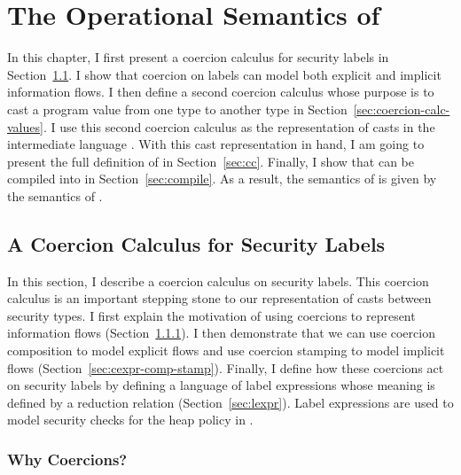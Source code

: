 \chapter{The Operational Semantics of \Surface}
\label{ch:sem}

In this chapter, I first present a coercion calculus for security labels in
Section~\ref{sec:coercion-calc-labels}. I show that coercion on labels can model
both explicit and implicit information flows. I then define a second coercion
calculus whose purpose is to cast a program value from one type to another type
in Section~\ref{sec:coercion-calc-values}. I use this second coercion calculus
as the representation of casts in the intermediate language \CC. With this cast
representation in hand, I am going to present the full definition of \CC in
Section~\ref{sec:cc}. Finally, I show that \Surface can be compiled into \CC in
Section~\ref{sec:compile}. As a result, the semantics of \Surface is given by
the semantics of \CC.

\section{A Coercion Calculus for Security Labels}
\label{sec:coercion-calc-labels}

In this section, I describe a coercion calculus on security labels. This
coercion calculus is an important stepping stone to our representation of casts
between security types. I first explain the motivation of using coercions to
represent information flows (Section~\ref{sec:motiv}). I then demonstrate that
we can use coercion composition to model explicit flows and use coercion
stamping to model implicit flows (Section~\ref{sec:cexpr-comp-stamp}). Finally,
I define how these coercions act on security labels by defining a language of
label expressions whose meaning is defined by a reduction relation
(Section~\ref{sec:lexpr}). Label expressions are used to model security checks
for the heap policy in \CC.

\subsection{Why Coercions?}
\label{sec:motiv}

